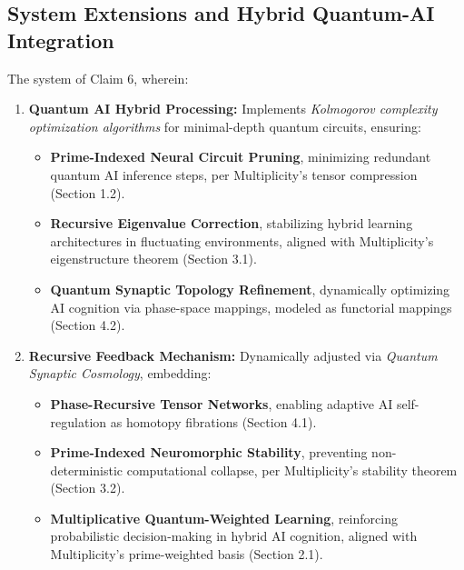 \documentclass[12pt]{article}
\begin{document}
\subsection{System Extensions and Hybrid Quantum-AI Integration}

The system of Claim 6, wherein:

\begin{enumerate}
    \item \textbf{Quantum AI Hybrid Processing:} Implements \textit{Kolmogorov complexity optimization algorithms} for minimal-depth quantum circuits, ensuring:
    \begin{itemize}
        \item \textbf{Prime-Indexed Neural Circuit Pruning}, minimizing redundant quantum AI inference steps, per Multiplicity’s tensor compression (Section 1.2).
        \item \textbf{Recursive Eigenvalue Correction}, stabilizing hybrid learning architectures in fluctuating environments, aligned with Multiplicity’s eigenstructure theorem (Section 3.1).
        \item \textbf{Quantum Synaptic Topology Refinement}, dynamically optimizing AI cognition via phase-space mappings, modeled as functorial mappings (Section 4.2).
    \end{itemize}

    \item \textbf{Recursive Feedback Mechanism:} Dynamically adjusted via \textit{Quantum Synaptic Cosmology}, embedding:
    \begin{itemize}
        \item \textbf{Phase-Recursive Tensor Networks}, enabling adaptive AI self-regulation as homotopy fibrations (Section 4.1).
        \item \textbf{Prime-Indexed Neuromorphic Stability}, preventing non-deterministic computational collapse, per Multiplicity’s stability theorem (Section 3.2).
        \item \textbf{Multiplicative Quantum-Weighted Learning}, reinforcing probabilistic decision-making in hybrid AI cognition, aligned with Multiplicity’s prime-weighted basis (Section 2.1).
    \end{itemize}


\end{enumerate}
\end{document}
